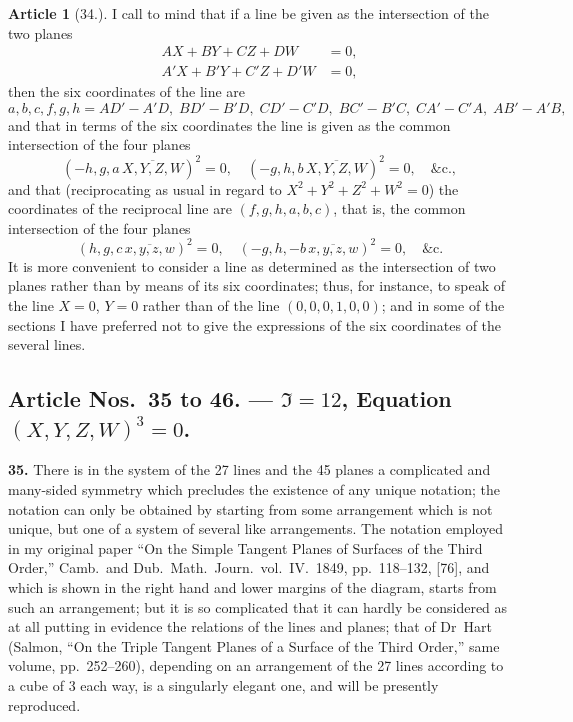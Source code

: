 \documentclass[11pt,a4paper]{article}
\theoremstyle{definition}
\newtheorem{art}{Article}
\begin{document}
\begin{art}[34.]
I call to mind that if a line be given as the intersection of the two planes
\begin{align*}
AX + BY + CZ + DW &= 0, \\
A'X + B'Y + C'Z + D'W &= 0,
\end{align*}
then the six coordinates of the line are
\[
a, b, c, f, g, h = AD' - A'D,\; BD' - B'D,\; CD' - C'D,\; BC' - B'C,\; CA' - C'A,\; AB' - A'B,
\]
and that in terms of the six coordinates the line is given as the common intersection of the four planes
\[
(-h, g, a \,\overline{\!\!\!X, Y, Z, W\!\!\!})^2 = 0, \quad (-g, h, b \,\overline{\!\!\!X, Y, Z, W\!\!\!})^2 = 0, \quad \&\text{c.},
\]
and that (reciprocating as usual in regard to $X^2 + Y^2 + Z^2 + W^2 = 0$) the coordinates of the reciprocal line are $(f, g, h, a, b, c)$, that is, the common intersection of the four planes
\[
(h, g, c \,\overline{\!\!\!x, y, z, w\!\!\!})^2 = 0, \quad (-g, h, -b \,\overline{\!\!\!x, y, z, w\!\!\!})^2 = 0, \quad \&\text{c.}
\]
It is more convenient to consider a line as determined as the intersection of two planes rather than by means of its six coordinates; thus, for instance, to speak of the line $X = 0$, $Y = 0$ rather than of the line $(0, 0, 0, 1, 0, 0)$; and in some of the sections I have preferred not to give the expressions of the six coordinates of the several lines.
\end{art}



\newpage
\setcounter{page}{372}

\subsection*{Article Nos.~35 to 46. --- \texorpdfstring{$\mathfrak{I} = 12$}{I = 12}, Equation $(X, Y, Z, W)^3 = 0$.}

\textbf{35.} There is in the system of the 27 lines and the 45 planes a complicated and many-sided symmetry which precludes the existence of any unique notation; the notation can only be obtained by starting from some arrangement which is not unique, but one of a system of several like arrangements. The notation employed in my original paper ``On the Simple Tangent Planes of Surfaces of the Third Order,'' Camb.\ and Dub.\ Math.\ Journ.\ vol.~IV.\ 1849, pp.~118--132, [76], and which is shown in the right hand and lower margins of the diagram, starts from such an arrangement; but it is so complicated that it can hardly be considered as at all putting in evidence the relations of the lines and planes; that of Dr~Hart (Salmon, ``On the Triple Tangent Planes of a Surface of the Third Order,'' same volume, pp.~252--260), depending on an arrangement of the 27 lines according to a cube of 3 each way, is a singularly elegant one, and will be presently reproduced.
\end{document}
